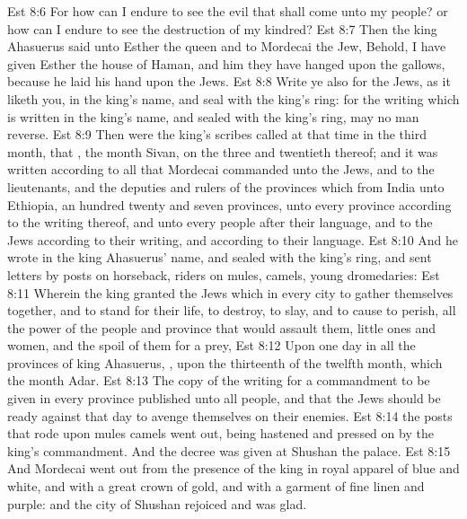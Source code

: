 \vs Est 8:6 For how can I endure to see the evil that shall come unto my people? or how can I endure to see the destruction of my kindred?
\vs Est 8:7 Then the king Ahasuerus said unto Esther the queen and to Mordecai the Jew, Behold, I have given Esther the house of Haman, and him they have hanged upon the gallows, because he laid his hand upon the Jews.
\vs Est 8:8 Write ye also for the Jews, as it liketh you, in the king's name, and seal  with the king's ring: for the writing which is written in the king's name, and sealed with the king's ring, may no man reverse.
\vs Est 8:9 Then were the king's scribes called at that time in the third month, that , the month Sivan, on the three and twentieth  thereof; and it was written according to all that Mordecai commanded unto the Jews, and to the lieutenants, and the deputies and rulers of the provinces which  from India unto Ethiopia, an hundred twenty and seven provinces, unto every province according to the writing thereof, and unto every people after their language, and to the Jews according to their writing, and according to their language.
\vs Est 8:10 And he wrote in the king Ahasuerus' name, and sealed  with the king's ring, and sent letters by posts on horseback,  riders on mules, camels,  young dromedaries:
\vs Est 8:11 Wherein the king granted the Jews which  in every city to gather themselves together, and to stand for their life, to destroy, to slay, and to cause to perish, all the power of the people and province that would assault them,  little ones and women, and  the spoil of them for a prey,
\vs Est 8:12 Upon one day in all the provinces of king Ahasuerus, , upon the thirteenth  of the twelfth month, which  the month Adar.
\vs Est 8:13 The copy of the writing for a commandment to be given in every province  published unto all people, and that the Jews should be ready against that day to avenge themselves on their enemies.
\vs Est 8:14  the posts that rode upon mules  camels went out, being hastened and pressed on by the king's commandment. And the decree was given at Shushan the palace.
\vs Est 8:15 And Mordecai went out from the presence of the king in royal apparel of blue and white, and with a great crown of gold, and with a garment of fine linen and purple: and the city of Shushan rejoiced and was glad.
